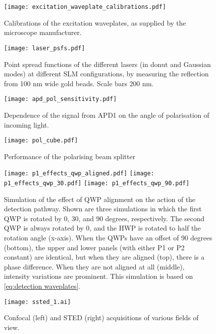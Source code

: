 \begin{figure}
	\centering
	\texttt{[image: excitation\_waveplate\_calibrations.pdf]}
	\caption{
		Calibrations of the excitation waveplates, as supplied by the microscope manufacturer.
	}
	\label{fig:excitation waveplate calibration}
\end{figure}

\begin{figure}
	\centering
	\texttt{[image: laser\_psfs.pdf]}
	\caption{
		Point spread functions of the different lasers (in donut and Gaussian modes) at different SLM configurations, by measuring the reflection from 100 nm wide gold beads. Scale bars 200 nm.
	}
	\label{fig:normal psfs}
\end{figure}

\begin{figure}
	\centering
	\texttt{[image: apd\_pol\_sensitivity.pdf]}
	\caption{Dependence of the signal from APD1 on the angle of polarisation of incoming light.}
	\label{fig:apd pol sensitivity}
\end{figure}

\begin{figure}
	\centering
	\texttt{[image: pol\_cube.pdf]}
	\caption{Performance of the polarising beam splitter }
	\label{fig:pol cube}
\end{figure}

\begin{figure}
	\centering
	\texttt{[image: p1\_effects\_qwp\_aligned.pdf]}
	\texttt{[image: p1\_effects\_qwp\_30.pdf]}
	\texttt{[image: p1\_effects\_qwp\_90.pdf]}
	\caption{
		Simulation of the effect of QWP alignment on the action of the detection pathway. Shown are three simulations in which the first QWP is rotated by 0, 30, and 90 degrees, respectively. The second QWP is always rotated by 0, and the HWP is rotated to half the rotation angle (x-axis). When the QWPs have an offset of 90 degrees (bottom), the upper and lower panels (with either P1 or P2 constant) are identical, but when they are aligned (top), there is a phase difference. When they are not aligned at all (middle), intensity variations are prominent. This simulation is based on \autoref{eq:detection waveplates}.
	}
	\label{fig:detection waveplate simulations}
\end{figure}

\begin{figure}
	\centering
	\texttt{[image: ssted\_1.ai]}
	\caption{
		Confocal (left) and STED (right) acquisitions of various fields of view.
	}
	\label{fig:ssted supplementary}
\end{figure}


